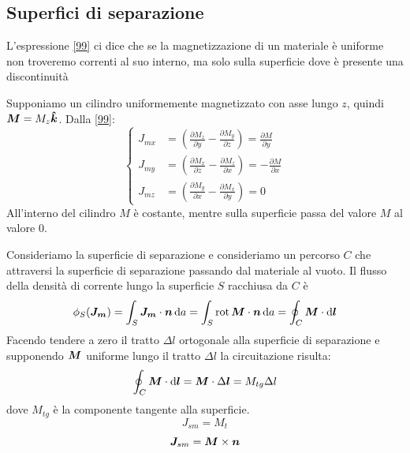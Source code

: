 \subsection{Superfici di separazione}
L'espressione \eqref{99} ci dice che se la magnetizzazione di un materiale è uniforme non troveremo correnti al suo interno, ma solo sulla superficie dove è presente una discontinuità

Supponiamo un cilindro uniformemente magnetizzato con asse lungo $z$, quindi $\boldsymbol{M}=M_z\boldsymbol{\hat {k}}$. Dalla \eqref{99}:
\begin{equation}
  \left\{
  \begin{aligned}
    J_{mx} & =\left(\frac{\partial M_z}{\partial y}-\frac{\partial M_y}{\partial z}\right)=\frac{\partial M}{\partial y}  \\
    J_{my} & =\left(\frac{\partial M_x}{\partial z}-\frac{\partial M_z}{\partial x}\right)=-\frac{\partial M}{\partial x} \\
    J_{mz} & =\left(\frac{\partial M_y}{\partial x}-\frac{\partial M_x}{\partial y}\right)=0
  \end{aligned}
  \right.
\end{equation}
All'interno del cilindro $M$ è costante, mentre sulla superficie passa del valore $M$ al valore $0$.

Consideriamo la superficie di separazione e consideriamo un percorso $C$ che attraversi la superficie di separazione passando dal materiale al vuoto. Il flusso della densità di corrente lungo la superficie $S$ racchiusa da $C$ è
\begin{equation}
  \phi_S(\boldsymbol{J_m})=\int_S \boldsymbol{J_m}\cdot\boldsymbol{n}\,\mathrm{d} a=\int_S \operatorname{rot}\boldsymbol{M}\cdot\boldsymbol{n}\,\mathrm{d} a=\oint_C \boldsymbol{M}\cdot\mathrm{d}\boldsymbol{l}
\end{equation}
Facendo tendere a zero il tratto $\Delta l$ ortogonale alla superficie di separazione e supponendo $\boldsymbol{M}$ uniforme lungo il tratto $\Delta l$ la circuitazione risulta:
\begin{equation}
  \oint_C \boldsymbol{M}\cdot\mathrm{d}\boldsymbol{l}=\boldsymbol{M}\cdot \Delta \boldsymbol{l}=M_{tg}\Delta l
\end{equation}
dove $M_{tg}$ è la componente tangente alla superficie.
\begin{equation}
  J_{sm}=M_t
\end{equation}
\begin{equation}
  \boldsymbol{J}_{sm}=\boldsymbol{M}\times \boldsymbol{n}
  \label{correnti_superficiali}
\end{equation}

